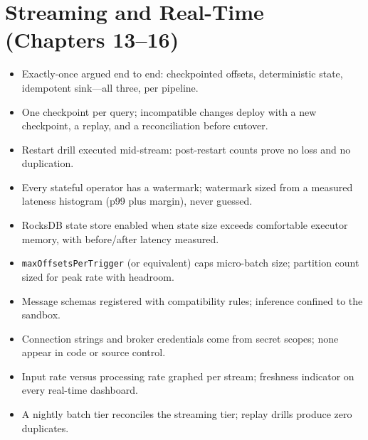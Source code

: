 \section{Streaming and Real-Time (Chapters 13--16)}
%
\begin{itemize}
    \item[$\square$] Exactly-once argued end to end: checkpointed offsets, deterministic state,
    idempotent sink---all three, per pipeline.
    \item[$\square$] One checkpoint per query; incompatible changes deploy with a new checkpoint,
    a replay, and a reconciliation before cutover.
    \item[$\square$] Restart drill executed mid-stream: post-restart counts prove no loss and no
    duplication.
    \item[$\square$] Every stateful operator has a watermark; watermark sized from a measured
    lateness histogram (p99 plus margin), never guessed.
    \item[$\square$] RocksDB state store enabled when state size exceeds comfortable executor
    memory, with before/after latency measured.
    \item[$\square$] \texttt{maxOffsetsPerTrigger} (or equivalent) caps micro-batch size;
    partition count sized for peak rate with headroom.
    \item[$\square$] Message schemas registered with compatibility rules; inference confined to
    the sandbox.
    \item[$\square$] Connection strings and broker credentials come from secret scopes; none
    appear in code or source control.
    \item[$\square$] Input rate versus processing rate graphed per stream; freshness indicator on
    every real-time dashboard.
    \item[$\square$] A nightly batch tier reconciles the streaming tier; replay drills produce
    zero duplicates.
\end{itemize}

